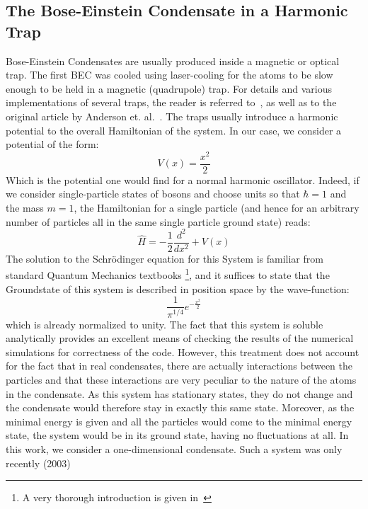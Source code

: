 \subsection{The Bose-Einstein Condensate in a Harmonic Trap}
Bose-Einstein Condensates are usually produced inside a magnetic or optical trap. The first BEC was cooled using
laser-cooling for the atoms to be slow enough to be held in a magnetic (quadrupole) trap. For details and various
implementations of several traps, the reader is referred to~\cite{pethick}, as well as to the original article 
by Anderson et. al.~\cite{anderson}. 
The traps usually introduce a harmonic potential to the overall Hamiltonian of the system. In our case, we consider 
a potential of the form:
\begin{equation}\label{eq:trap}
	V(x)=\frac{x^2}{2}
\end{equation}
Which is the potential one would find for a normal harmonic oscillator. Indeed, if we consider single-particle
states of bosons and choose units so that $\hbar=1$ and the mass $m=1$, the Hamiltonian for a single particle (and hence for an 
arbitrary number of particles all
in the same single particle ground state) reads:
\begin{equation}\label{eq:trapham}
	\hat{H}=-\frac{1}{2}\frac{d^2}{dx^2}+V(x)
\end{equation}
The solution to the  Schr\"odinger equation for this System is familiar from standard Quantum Mechanics textbooks
\footnote{A very thorough introduction is given in~\cite{schwabl}}, 
and it suffices to state that the Groundstate
of this system is described in position space by the wave-function:
\begin{equation}\label{eq:HOsol}
	\frac{1}{\pi^{1/4}}e^{-\frac{x^2}{2}}
\end{equation}
which is already normalized to unity. The fact that this system is soluble analytically provides an excellent means of 
checking the results of the numerical simulations for correctness of the code. However, this treatment does not account for the fact that in real condensates,
there are actually interactions between the particles and that these interactions are very peculiar to the nature of the atoms in the condensate. As this system has
stationary states, they do not change and the condensate would therefore stay in exactly this same state. Moreover, as the minimal energy is given and all 
the particles would come to the minimal energy state, the system would be in its ground state, having no fluctuations at all. In this work, we consider a one-dimensional condensate. Such a system was only recently (2003)
